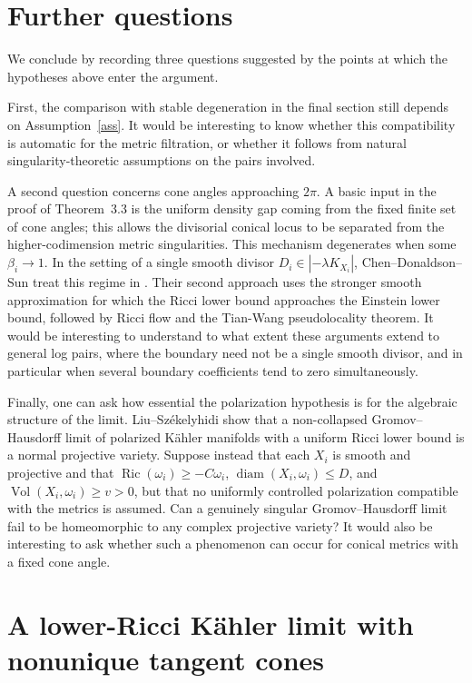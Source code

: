 \documentclass[11pt]{amsart}
\theoremstyle{definition}
\theoremstyle{remark}
\begin{document}
\section{Further questions}

We conclude by recording three questions suggested by the points at which the
hypotheses above enter the argument.

First, the comparison with stable degeneration in the final section still
depends on Assumption~\ref{ass}. It would be interesting to know
whether this compatibility is automatic for the metric filtration, or whether
it follows from natural singularity-theoretic assumptions on the pairs
involved. 

A second question concerns cone angles approaching $2\pi$.  A basic input in
the proof of Theorem~3.3 is the uniform density gap coming from the fixed
finite set of cone angles; this allows the divisorial conical locus to be
separated from the higher-codimension metric singularities. This mechanism
degenerates when some $\beta_i\to1$.  In the setting of a single smooth
divisor $D_i\in|-\lambda K_{X_i}|$, Chen--Donaldson--Sun treat this regime in
\cite{CDSIII}. Their second approach
uses the stronger smooth approximation for which the Ricci lower bound
approaches the Einstein lower bound, followed by Ricci flow and the
Tian-Wang pseudolocality theorem. It would be interesting to understand to what
extent these arguments extend to general log pairs, where the boundary need
not be a single smooth divisor, and in particular when several boundary
coefficients tend to zero simultaneously.

Finally, one can ask how essential the polarization hypothesis is for the
algebraic structure of the limit.  Liu--Sz\'ekelyhidi \cite[Theorem~1.1]{SLI} show that a
non-collapsed Gromov--Hausdorff limit of polarized K\"ahler manifolds with a
uniform Ricci lower bound is a normal projective variety. Suppose instead that each $X_i$ is smooth and
projective and that
$\operatorname{Ric}(\omega_i)\geq-C\omega_i$,
$\operatorname{diam}(X_i,\omega_i)\leq D$, and
$\operatorname{Vol}(X_i,\omega_i)\geq v>0$, but that no uniformly controlled
polarization compatible with the metrics is assumed.  Can a genuinely
singular Gromov--Hausdorff limit fail to be homeomorphic to any complex
projective variety?  It would also be interesting to ask whether such a
phenomenon can occur for conical metrics with a fixed cone angle.


\appendix
\section{A lower-Ricci K\"ahler limit with nonunique tangent cones}
\label{app:nonunique-tangent-cones}
\end{document}
